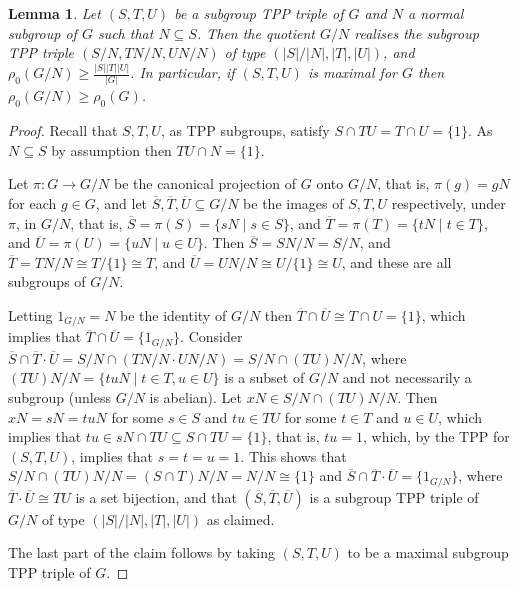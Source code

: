 \documentclass{amsart}
\theoremstyle{observation}
\newtheorem{lemma}[theorem]{Lemma}
\theoremstyle{definition}
\theoremstyle{remark}
\numberwithin{equation}{section}
\begin{document}
\begin{lemma}\textup{\citep{Neu2012}}\label{LemNeuQuoSubTPP} Let $(S, T, U)$ be a subgroup TPP triple of $G$ and $N$ a normal subgroup of $G$ such that $N \subseteq S$. Then the quotient $G/N$ realises the subgroup TPP triple $(S/N,TN/N,UN/N)$ of type $\left(|S|/|N|, |T|, |U|\right)$, and $\rho_0(G/N) \geq \frac{|S||T||U|}{|G|}$. In particular, if $(S, T, U)$ is maximal for $G$ then $\rho_0(G/N) \geq \rho_0(G)$.
\end{lemma}
\begin{proof} Recall that $S, T, U$, as TPP subgroups, satisfy $S \mathrel \cap TU = T \mathrel \cap U = \{1\}$. As $N \subseteq S$ by assumption then $TU \cap N =\{1\}$. 

\vspace{1mm}

Let $\pi:G \rightarrow G/N$ be the canonical projection of $G$ onto $G/N$, that is, $\pi(g) = gN$ for each $g \in G$, and let $\overline{S}, \overline{T}, \overline{U} \subseteq G/N$ be the images of $S, T, U$ respectively, under $\pi$, in $G/N$, that is, $\overline{S} = \pi(S) = \{sN \mathrel | s \in S\}$, and $\overline{T} = \pi(T) = \{tN \mathrel | t \in T\}$, and $\overline{U} = \pi(U) = \{uN \mathrel | u \in U \}$. Then $\overline{S} = SN/N = S/N$, and $\overline{T} = TN/N \cong T/\{1\} \cong T$, and $\overline{U} = UN/N \cong U/\{1\} \cong U$, and these are all subgroups of $G/N$.

\vspace{1mm}

Letting $1_{G/N} = N$ be the identity of $G/N$ then $\overline{T} \cap \overline{U} \cong T \cap U = \{1\}$, which implies that $\overline{T} \cap \overline{U} = \{1_{G/N}\}$. Consider $\overline{S} \cap \overline{T}\cdot \overline{U} = S/N \cap (TN/N \cdot UN/N) = S/N \cap (TU)N/N$, where $(TU)N/N = \{tuN \mathrel | t \in T, u \in U\}$ is a subset of $G/N$ and not necessarily a subgroup (unless $G/N$ is abelian). Let $xN \in S/N \cap (TU)N/N$. Then $xN = sN = tuN$ for some $s \in S$ and $tu \in TU$ for some $t \in T$ and $u \in U$, which implies that $tu \in sN \cap TU \subseteq S \cap TU = \{1\}$, that is, $tu = 1$, which, by the TPP for $(S, T, U)$, implies that $s = t = u = 1$. This shows that $S/N \cap (TU)N/N = (S \cap T)N/N = N/N \cong \{1\}$ and $\overline{S} \cap \overline{T}\cdot \overline{U} = \{1_{G/N}\}$, where $\overline{T}\cdot\overline{U} \cong TU$ is a set bijection, and that $(\overline{S}, \overline{T}, \overline{U})$ is a subgroup TPP triple of $G/N$ of type $(|S|/|N|, |T|, |U|)$ as claimed.

\vspace{1mm}

The last part of the claim follows by taking $(S, T, U)$ to be a maximal subgroup TPP triple of $G$.
\end{proof}
\end{document}
